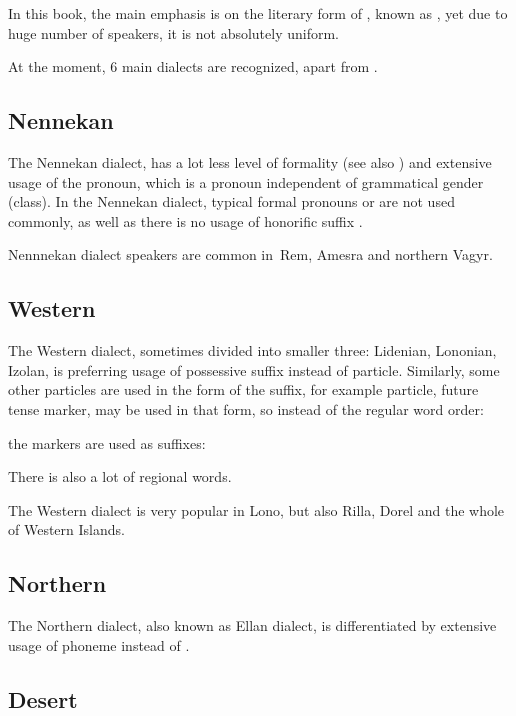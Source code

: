 In this book, the main emphasis is on the literary form of \andro, known
as , yet due to huge number of speakers, it is
not absolutely uniform.

At the moment, 6 main dialects are recognized, apart from .

\subsection{Nennekan}

The Nennekan dialect, has a lot less level of formality (see also
) and extensive usage of the  pronoun,
which is a \Tsg{} pronoun independent of grammatical gender (class). In the
Nennekan dialect, typical formal pronouns  or  are
not used commonly, as well as there is no usage of honorific suffix
.

Nennnekan dialect speakers are common in~Rem, Amesra and northern Vagyr.

\subsection{Western}
The Western dialect, sometimes divided into smaller three: Lidenian, Lononian,
Izolan, is preferring usage of possessive suffix  instead of
 particle. Similarly, some other particles are used in the form of
the suffix, for example  particle, future tense marker, may be used
in that form, so instead of the regular word order:


the markers are used as suffixes:


There is also a lot of regional words.

The Western dialect is very popular in Lono, but also Rilla, Dorel and the whole
of Western Islands.

\subsection{Northern}

The Northern dialect, also known as Ellan dialect, is differentiated by
extensive usage of  phoneme instead of .

\subsection{Desert}

